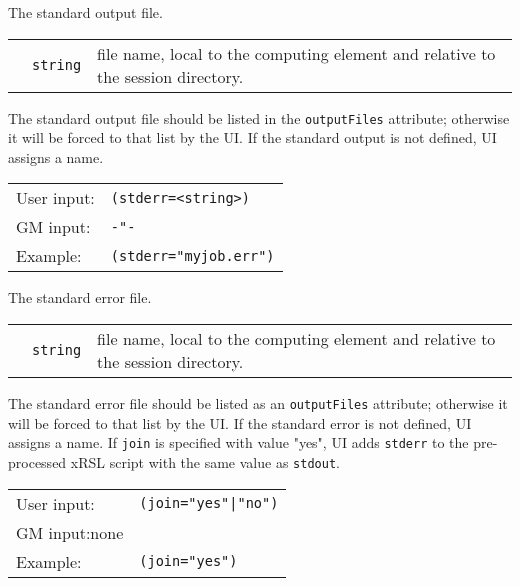   The standard output file.

  \begin{tabular}{llp{10cm}}
    \hspace*{1cm}&\texttt{string} & file name, local to the computing element and
    relative to the session directory.\\
  \end{tabular}

  The standard output file should be listed in the
  \texttt{outputFiles} attribute; otherwise it will be forced to that
  list by the UI. If the standard output is not defined, UI assigns a
  name.

  \hspace*{0.5cm}
  \begin{shaded}
  \end{shaded}
  \begin{tabular}{lp{13cm}}
    User input:&\verb#(stderr=<string>)#\\
    GM input:&\verb#-"-#\\
    Example:&\verb#(stderr="myjob.err")#\\
  \end{tabular}

  The standard error file.

  \begin{tabular}{llp{10cm}}
    \hspace*{1cm}&\texttt{string} & file name, local to the computing element and
    relative to the session directory.\\
  \end{tabular}

  The standard error file should be listed as an \texttt{outputFiles}
  attribute; otherwise it will be forced to that list by the UI. If
  the standard error is not defined, UI assigns a name. If \texttt{join} is 
  specified with value "yes", UI adds \texttt{stderr} to the 
  pre-processed xRSL script with the same value as \texttt{stdout}.

  \hspace*{0.5cm}
  \begin{shaded}
  \end{shaded}
  \begin{tabular}{lp{13cm}}
    User input:&\verb#(join="yes"|"no")#\\
    GM input:none\\
    Example:&\verb#(join="yes")#\\
  \end{tabular}


